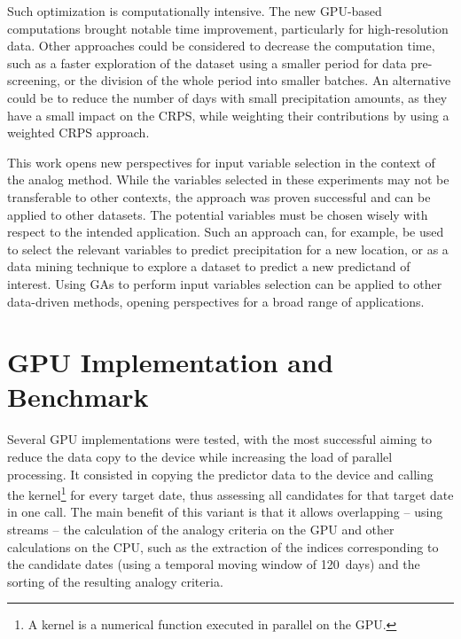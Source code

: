 \documentclass[draft]{agujournal2019}
\begin{document}
Such optimization is computationally intensive. The new GPU-based computations brought notable time improvement, particularly for high-resolution data. Other approaches could be considered to decrease the computation time, such as a faster exploration of the dataset using a smaller period for data pre-screening, or the division of the whole period into smaller batches. An alternative could be to reduce the number of days with small precipitation amounts, as they have a small impact on the CRPS, while weighting their contributions by using a weighted CRPS approach.

This work opens new perspectives for input variable selection in the context of the analog method. While the variables selected in these experiments may not be transferable to other contexts, the approach was proven successful and can be applied to other datasets. The potential variables must be chosen wisely with respect to the intended application. Such an approach can, for example, be used to select the relevant variables to predict precipitation for a new location, or as a data mining technique to explore a dataset to predict a new predictand of interest. Using GAs to perform input variables selection can be applied to other data-driven methods, opening perspectives for a broad range of applications.


%
%

\FloatBarrier

\appendix

\section{GPU Implementation and Benchmark}

Several GPU implementations were tested, with the most successful aiming to reduce the data copy to the device while increasing the load of parallel processing. It consisted in copying the predictor data to the device and calling the kernel\footnote{A kernel is a numerical function executed in parallel on the GPU.} for every target date, thus assessing all candidates for that target date in one call. The main benefit of this variant is that it allows overlapping -- using streams -- the calculation of the analogy criteria on the GPU and other calculations on the CPU, such as the extraction of the indices corresponding to the candidate dates (using a temporal moving window of 120~days) and the sorting of the resulting analogy criteria.
\end{document}

